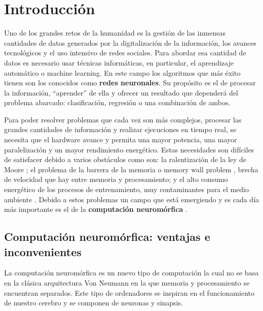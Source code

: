 \chapter{Introducción} \label{introduccion}
Uno de los grandes retos de la humanidad es la gestión de las inmensas cantidades de datos generados por la digitalización de la información, los avances tecnológicos y el uso intensivo de redes sociales. Para abordar esa cantidad de datos es necesario usar técnicas informáticas, en particular, el aprendizaje automático o machine learning. En este campo los algoritmos que más éxito tienen son los conocidos como \textbf{redes neuronales}. Su propósito es el de procesar la información, ``aprender'' de ella y ofrecer un resultado que dependerá del problema abarcado: clasificación, regresión o una combinación de ambos. 

Para poder resolver problemas que cada vez son más complejos, procesar las grandes cantidades de información y realizar ejecuciones en tiempo real, se necesita que el hardware avance y permita una mayor potencia, una mayor paralelización y un mayor rendimiento energético. Estas necesidades son difíciles de satisfacer debido a varios obstáculos como son: la ralentización de la ley de Moore \cite{eeckhout2017moore}; el problema de la barrera de la memoria o memory wall problem \cite{10.1145/977091.977115}, brecha de velocidad que hay entre memoria y procesamiento; y el alto consumo energético de los procesos de entrenamiento, muy contaminantes para el medio ambiente \cite{RefWorks:RefID:25-dhar2020the}. Debido a estos problemas un campo que está emergiendo y es cada día más importante es el de la \textbf{computación neuromórfica} \cite{RefWorks:RefID:4-schuman2022opportunities}. 

\section{Computación neuromórfica: ventajas e inconvenientes}
La computación neuromórfica es un nuevo tipo de computación la cual no se basa en la clásica arquitectura Von Neumann en la que memoria y procesamiento se encuentran separados. Este tipo de ordenadores se inspiran en el funcionamiento de nuestro cerebro y se componen de neuronas y sinapsis. 

